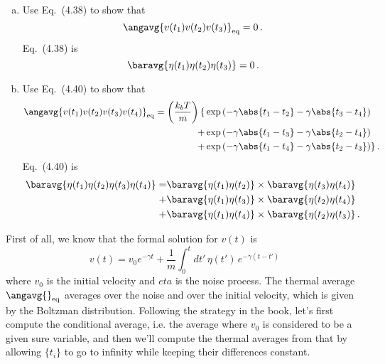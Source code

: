 

\begin{enumerate}[a.]
\item Use Eq.~(4.38) to show that
\begin{equation*}
  \angavg{v(t_1) v(t_2) v(t_3)}_\text{eq} = 0 \, .
\end{equation*}
Eq.~(4.38) is
\begin{equation*}
  \baravg{\eta(t_1) \eta(t_2) \eta(t_3)} = 0 \, .
\end{equation*}
\item Use Eq.~(4.40) to show that
\begin{align*}
  \angavg{v(t_1) v(t_2) v(t_3) v(t_4)}_\text{eq}
  = \left( \frac{k_b T}{m} \right) \{
    &\exp \left(-\gamma \abs{t_1 - t_2} - \gamma \abs{t_3 - t_4} \right) \\
  + &\exp \left(-\gamma \abs{t_1 - t_3} - \gamma \abs{t_2 - t_4} \right) \\
  + &\exp \left(-\gamma \abs{t_1 - t_4} - \gamma \abs{t_2 - t_3} \right)
  \}
  \, .
\end{align*}
Eq.~(4.40) is
\begin{align*}
  \baravg{\eta(t_1) \eta(t_2) \eta(t_3) \eta(t_4)} =
  &  \baravg{\eta(t_1) \eta(t_2)} \times \baravg{\eta(t_3) \eta(t_4)} \\
  +& \baravg{\eta(t_1) \eta(t_3)} \times \baravg{\eta(t_2) \eta(t_4)} \\
  +& \baravg{\eta(t_1) \eta(t_4)} \times \baravg{\eta(t_2) \eta(t_3)}
  \, .
\end{align*}
\end{enumerate}


First of all, we know that the formal solution for $v(t)$ is
\begin{equation*}
  v(t) = v_0 e^{-\gamma t} + \frac{1}{m} \int_0^t dt' \, \eta(t') \, e^{-\gamma(t - t')}
\end{equation*}
where $v_0$ is the initial velocity and $eta$ is the noise process.
The thermal average $\angavg{}_\text{eq}$ averages over the noise and over the initial velocity, which is given by the Boltzman distribution.
Following the strategy in the book, let's first compute the conditional average, i.e. the average where $v_0$ is considered to be a given sure variable, and then we'll compute the thermal averages from that by allowing $\{t_i\}$ to go to infinity while keeping their differences constant.

